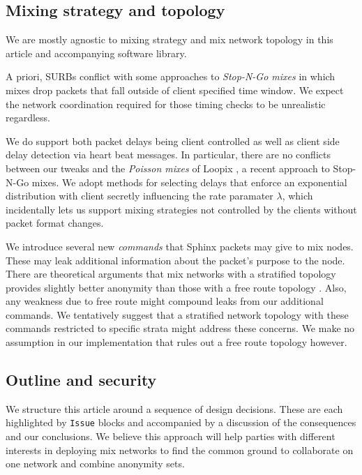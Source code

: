 \subsection{Mixing strategy and topology}

We are mostly agnostic to mixing strategy and mix network topology in
this article and accompanying software library.

A priori, SURBs conflict with some approaches to {\em Stop-N-Go mixes}
\cite{StopNGo} in which mixes drop packets that fall outside of client
specified time window.  We expect the network coordination required
for those timing checks to be unrealistic regardless. 

We do support both packet delays being client controlled as well as
client side delay detection via heart beat messages.  In particular,
there are no conflicts between our tweaks and the {\em Poisson mixes}
of Loopix \cite{Loopix}, a recent approach to Stop-N-Go mixes.
We adopt methods for selecting delays that enforce an exponential
distribution with client secretly influencing the rate paramater
$\lambda$, which incidentally lets us support mixing strategies not
controlled by the clients without packet format changes.

We introduce several new {\em commands} that Sphinx packets may give
to mix nodes.  These may leak additional information about the
packet's purpose to the node.  There are theoretical arguments that 
mix networks with a stratified topology provides slightly better
anonymity than those with a free route topology \cite{Diaz-??}.  
Also, any weakness due to free route might compound leaks from our
additional commands.  We tentatively suggest that a stratified
network topology with these commands restricted to specific strata
might address these concerns. %
We make no assumption in our implementation that rules out a free
route topology however.  

\subsection{Outline and security}

We structure this article around a sequence of design decisions.
These are each highlighted by {\tt Issue} blocks and accompanied by
a discussion of the consequences and our conclusions.  
%
We believe this approach will help parties with different interests
in deploying mix networks to find the common ground to collaborate
on one network and combine anonymity sets.

